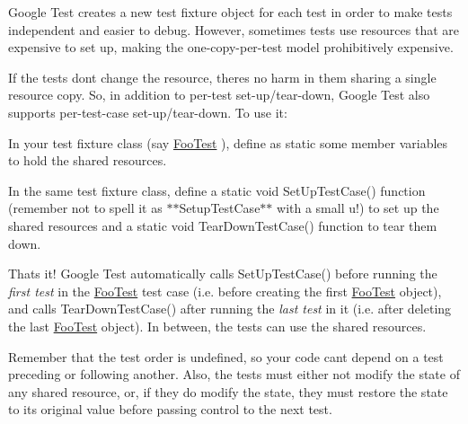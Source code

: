 Google Test creates a new test fixture object for each test in order to make tests independent and easier to debug. However, sometimes tests use resources that are expensive to set up, making the one-\/copy-\/per-\/test model prohibitively expensive.

If the tests don\textquotesingle{}t change the resource, there\textquotesingle{}s no harm in them sharing a single resource copy. So, in addition to per-\/test set-\/up/tear-\/down, Google Test also supports per-\/test-\/case set-\/up/tear-\/down. To use it\+:


\begin{DoxyEnumerate}
\item In your test fixture class (say {\ttfamily \hyperlink{class_foo_test}{Foo\+Test}} ), define as {\ttfamily static} some member variables to hold the shared resources.
\end{DoxyEnumerate}
\begin{DoxyEnumerate}
\item In the same test fixture class, define a {\ttfamily static void Set\+Up\+Test\+Case()} function (remember not to spell it as $\ast$$\ast${\ttfamily Setup\+Test\+Case}$\ast$$\ast$ with a small {\ttfamily u}!) to set up the shared resources and a {\ttfamily static void Tear\+Down\+Test\+Case()} function to tear them down.
\end{DoxyEnumerate}

That\textquotesingle{}s it! Google Test automatically calls {\ttfamily Set\+Up\+Test\+Case()} before running the {\itshape first test} in the {\ttfamily \hyperlink{class_foo_test}{Foo\+Test}} test case (i.\+e. before creating the first {\ttfamily \hyperlink{class_foo_test}{Foo\+Test}} object), and calls {\ttfamily Tear\+Down\+Test\+Case()} after running the {\itshape last test} in it (i.\+e. after deleting the last {\ttfamily \hyperlink{class_foo_test}{Foo\+Test}} object). In between, the tests can use the shared resources.

Remember that the test order is undefined, so your code can\textquotesingle{}t depend on a test preceding or following another. Also, the tests must either not modify the state of any shared resource, or, if they do modify the state, they must restore the state to its original value before passing control to the next test.

